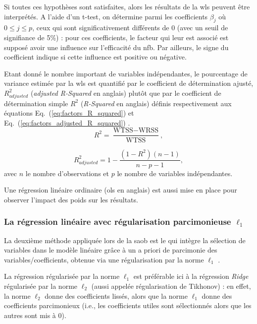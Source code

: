 Si toutes ces hypothèses sont satisfaites, alors les résultats de la \gls{wls} peuvent être interprétés. A l'aide d'un t-test, on détermine  
parmi les coefficients $\beta_{j}$ où $0 \leq j \leq p$, ceux qui sont significativement différents de 0 (avec un seuil de signifiance de 5\%) : 
pour ces coefficients, le facteur qui leur est associé est supposé avoir une influence sur l'efficacité du \gls{nfb}. Par ailleurs, 
le signe du coefficient indique si cette influence est positive ou négative. 

Etant donné le nombre important de variables indépendantes, le pourcentage de variance estimée par la \gls{wls} est quantifié par le coefficient de 
détermination ajusté, $R^2_{adjusted}$ (\textit{adjusted R-Squared} en anglais) plutôt que par le coefficient de détermination simple $R^2$ (\textit{R-Squared} en anglais)
définis respectivement aux équations Eq.~(\ref{eq:factors_R_squared}) et Eq.~(\ref{eq:factors_adjusted_R_squared}) \citep{James2013}.
\begin{equation}
\label{eq:factors_R_squared}
R^2 = \frac{ \text{WTSS} - \text{WRSS} }{ \text{WTSS} }, 
\end{equation}

\begin{equation}
\label{eq:factors_adjusted_R_squared}
R^2_{adjusted} = 1 - \frac{ (1 - R^2) (n - 1) }{ n - p - 1 }, 
\end{equation}
avec $n$ le nombre d'observations et $p$ le nombre de variables indépendantes.


Une régression linéaire ordinaire (\gls{ols} en anglais) est aussi mise en place pour observer l'impact des poids sur les résultats. 

\subsubsection{La régression linéaire avec régularisation parcimonieuse $\ell_1$}

La deuxième méthode appliquée lors de la \gls{saob} est le  qui intègre la sélection de variables dans le modèle linéaire grâce 
à un a priori de parcimonie des variables/coefficients, obtenue via une régularisation par la norme $\ell_1$ \citep{Tibshirani1996}.

La régression régularisée par la norme $\ell_1$ est préférable ici à la régression \textit{Ridge} \citep{James2013} régularisée par 
la norme $\ell_2$ (aussi appelée régularisation de Tikhonov) : en effet, la norme $\ell_2$ donne des coefficients lissés, alors que la norme $\ell_1$ donne des coefficients parcimonieux 
(i.e., les coefficients utiles sont sélectionnés alors que les autres sont mis à 0). 

